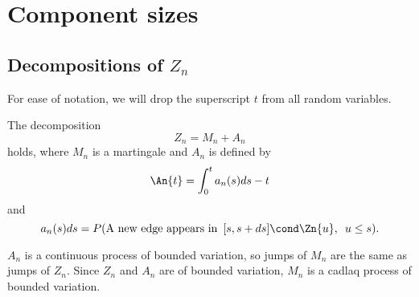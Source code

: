 
\chapter{Component sizes}

\section{Decompositions of $Z_n$}

For ease of notation, we will drop the superscript $t$ from all random variables.

\begin{lemma} \label{L: decomp Zn}
	The decomposition 
	\begin{equation} \label{E: decomp Zn}
	Z_n = M_n + A_n
	\end{equation}
	holds, where $M_n$ is a martingale and $A_n$ is defined by
	\begin{equation} \label{D: An}
	\An{t} = \int_{0}^{t} a_n(s)ds - t
	\end{equation}
	and
	\begin{equation} \label{D: an}
	a_n(s)ds = P(\text{A new edge appears in} \enspace [s, s+ds] \cond \Zn{u}, \enspace u \leq s).
	\end{equation}	
\end{lemma}
\begin{note} \label{N: decomp Zn}
	$A_n$ is a continuous process of bounded variation, so jumps of $M_n$ are the same as jumps of $Z_n$. Since $Z_n$ and $A_n$ are of bounded variation, $M_n$ is a cadlaq process of bounded variation.
\end{note}
